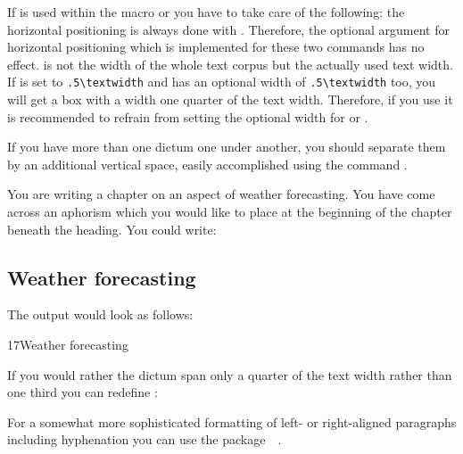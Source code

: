 If  is used within the macro 
or  you have to take care of the following: the
horizontal positioning is always done with .
Therefore, the optional argument for horizontal positioning which is
implemented for these two commands has no effect.  is
not the width of the whole text corpus but the actually used text
width.  If  is set to \verb;.5\textwidth; and
 has an optional width of
\verb;.5\textwidth; too, you will get a box with a width one quarter
of the text width.  Therefore, if you use  it is
recommended to refrain from setting the optional width for
 or .

If you have more than one dictum one under another, you should
separate them by an additional vertical space, easily accomplished using the
command .

\begin{Example}
  You are writing a chapter on an aspect of weather forecasting. You
  have come across an aphorism which you would like to place at the
  beginning of the chapter beneath the heading. You could write:
\begin{lstcode}
  \chapter{Weather forecasting}
\end{lstcode}
  The output would look as follows:
  \begin{ShowOutput}
    {%
      17\enskip Weather forecasting\par} \vspace{\baselineskip}
  \end{ShowOutput}

  If you would rather the dictum span only a quarter of the text width
  rather than one third you can redefine :
\begin{lstcode}
  \renewcommand*{\dictumwidth}{.25\textwidth}
\end{lstcode}
\end{Example}

For a somewhat more sophisticated formatting of left- or right-aligned
paragraphs including hyphenation you can use the
package~~\cite{package:ragged2e}.%
\fi
%
%
%
%
%
%
%
%
%
%
%
%
\fi  %


